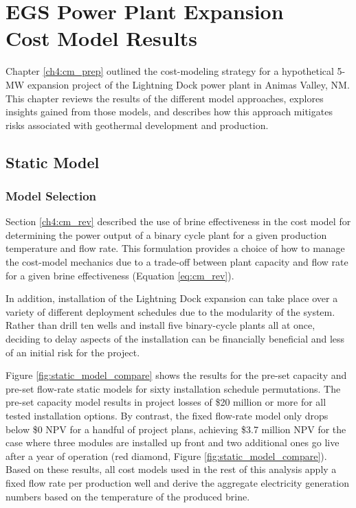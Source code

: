 \chapter{EGS Power Plant Expansion\\Cost Model Results}\label{ch6:cm_results}

Chapter \ref{ch4:cm_prep} outlined the cost-modeling strategy for a hypothetical 5-MW expansion project of the Lightning Dock power plant in Animas Valley, NM. This chapter reviews the results of the different model approaches, explores insights gained from those models, and describes how this approach mitigates risks associated with geothermal development and production.

\section{Static Model}\label{ch6:static_mod}

\subsection{Model Selection}\label{ch6:static_select}

Section \ref{ch4:cm_rev} described the use of brine effectiveness in the cost model for determining the power output of a binary cycle plant for a given production temperature and flow rate. This formulation provides a choice of how to manage the cost-model mechanics due to a trade-off between plant capacity and flow rate for a given brine effectiveness (Equation \ref{eq:cm_rev}).

In addition, installation of the Lightning Dock expansion can take place over a variety of different deployment schedules due to the modularity of the system. Rather than drill ten wells and install five binary-cycle plants all at once, deciding to delay aspects of the installation can be financially beneficial and less of an initial risk for the project.

Figure \ref{fig:static_model_compare} shows the results for the pre-set capacity and pre-set flow-rate static models for sixty installation schedule permutations. The pre-set capacity model results in project losses of \$20 million or more for all tested installation options. By contrast, the fixed flow-rate model only drops below \$0 NPV for a handful of project plans, achieving \$3.7 million NPV for the case where three modules are installed up front and two additional ones go live after a year of operation (red diamond, Figure \ref{fig:static_model_compare}). Based on these results, all cost models used in the rest of this analysis apply a fixed flow rate per production well and derive the aggregate electricity generation numbers based on the temperature of the produced brine.

